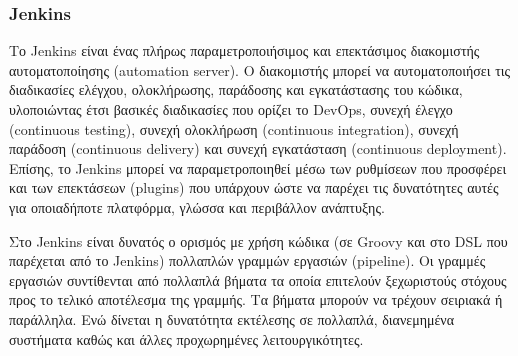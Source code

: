 \subsubsection{Jenkins} \label{subsection:4-3-1-3-jenkins}


Το Jenkins είναι ένας πλήρως παραμετροποιήσιμος και επεκτάσιμος διακομιστής αυτοματοποίησης (automation server). Ο διακομιστής μπορεί να αυτοματοποιήσει τις διαδικασίες ελέγχου, ολοκλήρωσης, παράδοσης και εγκατάστασης του κώδικα, υλοποιώντας έτσι βασικές διαδικασίες που ορίζει το DevOps, συνεχή έλεγχο (continuous testing), συνεχή ολοκλήρωση (continuous integration), συνεχή παράδοση (continuous delivery) και συνεχή εγκατάσταση (continuous deployment). Επίσης, το Jenkins μπορεί να παραμετροποιηθεί μέσω των ρυθμίσεων που προσφέρει και των επεκτάσεων (plugins) που υπάρχουν ώστε να παρέχει τις δυνατότητες αυτές για οποιαδήποτε πλατφόρμα, γλώσσα και περιβάλλον ανάπτυξης.

Στο Jenkins είναι δυνατός ο ορισμός με χρήση κώδικα (σε Groovy και στο DSL που παρέχεται από το Jenkins) πολλαπλών γραμμών εργασιών (pipeline). Οι γραμμές εργασιών συντίθενται από πολλαπλά βήματα τα οποία επιτελούν ξεχωριστούς στόχους προς το τελικό αποτέλεσμα της γραμμής. Τα βήματα μπορούν να τρέχουν σειριακά ή παράλληλα. Ενώ δίνεται η δυνατότητα εκτέλεσης σε πολλαπλά, διανεμημένα συστήματα καθώς και άλλες προχωρημένες λειτουργικότητες.
